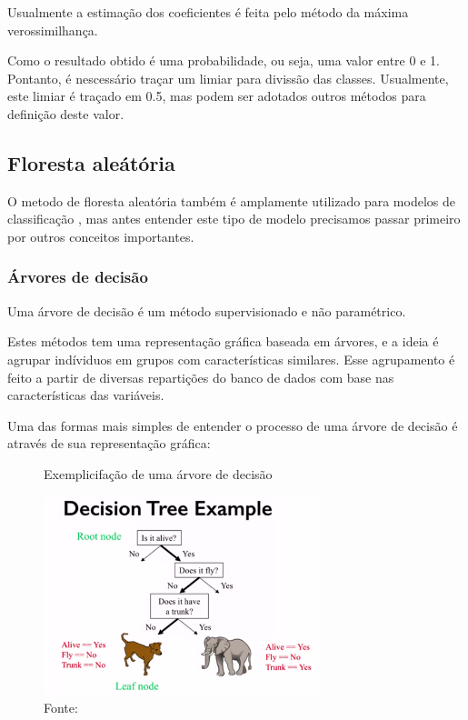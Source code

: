 \documentclass[12pt,a4paper]{article}
\begin{document}
Usualmente a estimação dos coeficientes é feita pelo método da máxima verossimilhança. 

Como o resultado obtido é uma probabilidade, ou seja, uma valor entre 0 e 1. Pontanto, é nescessário traçar um limiar para divissão das classes. Usualmente, este limiar é traçado em 0.5, mas podem ser adotados outros métodos para definição deste valor.



\subsection{Floresta aleátória}
O metodo de floresta aleatória também é amplamente utilizado para modelos de classificação , mas antes entender este tipo de modelo precisamos passar primeiro por outros conceitos importantes.


\subsubsection{Árvores de decisão}

Uma árvore de decisão é um método supervisionado e não paramétrico.

Estes métodos tem uma representação gráfica baseada em árvores, e a ideia é agrupar indíviduos em grupos com características similares. Esse agrupamento é feito a partir de diversas repartições do banco de dados com base nas características das variáveis.


Uma das formas mais simples de entender o processo de uma árvore de decisão é através de sua representação gráfica:


\begin{figure}[ht]
\centering
\caption{Exemplicifação de uma árvore de decisão}
  \includegraphics[width=8cm]{"images/dTreeExample.png"}
\caption*{Fonte: }%
  \label{dTree}
\end{figure} 
\end{document}
